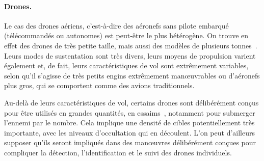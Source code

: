 	\paragraph{Drones.}
	Le cas des drones aériens, c'est-à-dire des aéronefs sans pilote embarqué (télécommandés ou autonomes) est peut-être le plus hétérogène. On trouve en effet des drones de très petite taille, mais aussi des modèles de plusieurs tonnes~\footnotemark. Leurs modes de sustentation sont très divers, leurs moyens de propulsion varient également et, de fait, leurs caractéristiques de vol sont extrêmement variables, selon qu'il s'agisse de très petits engins extrêmement manœuvrables ou d'aéronefs plus gros, qui se comportent comme des avions traditionnels.

	
	Au-delà de leurs caractéristiques de vol, certains drones sont délibérément conçus pour être utilisés en grandes quantités, en essaims\footnotemark~\cite{alonso2016distributed, saska2014autonomous}, notamment pour submerger l'ennemi par le nombre. Cela implique une densité de cibles potentiellement très importante, avec les niveaux d'occultation qui en découlent. L'on peut d'ailleurs supposer qu'ils seront impliqués dans des manœuvres délibérément conçues pour compliquer la détection, l'identification et le suivi des drones individuels.
	
	
